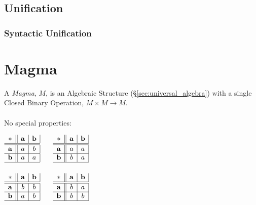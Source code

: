 \subsection{Unification}\label{sec:unification}

\subsubsection{Syntactic Unification}\label{sec:syntactic_unification}



\section{Magma}\label{sec:magma}

A \emph{Magma}, $M$, is an Algebraic Structure
(\S\ref{sec:universal_algebra}) with a single Closed Binary Operation,
$M \times M \rightarrow M$.
\\ \\
No special properties:

$\begin{array}{c||c|c|}
  * & \mathbf{a} & \mathbf{b} \\ \hline \hline
  \mathbf{a} & a & b \\ \hline
  \mathbf{b} & a & a \\ \hline
\end{array}$ $\quad$ $\begin{array}{c||c|c|}
  * & \mathbf{a} & \mathbf{b} \\ \hline \hline
  \mathbf{a} & a & a \\ \hline
  \mathbf{b} & b & a \\ \hline
\end{array}$ \\ \hfill \\

$\begin{array}{c||c|c|}
  * & \mathbf{a} & \mathbf{b} \\ \hline \hline
  \mathbf{a} & b & b \\ \hline
  \mathbf{b} & a & b \\ \hline
\end{array}$ $\quad$ $\begin{array}{c||c|c|}
  * & \mathbf{a} & \mathbf{b} \\ \hline \hline
  \mathbf{a} & b & a \\ \hline
  \mathbf{b} & b & b \\ \hline
\end{array}$ \\ \hfill \\

